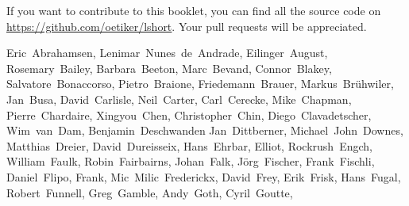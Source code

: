 If you want to contribute to this booklet, you can find all the source code
on \url{https://github.com/oetiker/lshort}. Your pull requests will be
appreciated.

\begin{FlushLeft}
  \small
  Eric~Abrahamsen,        %
  Lenimar~Nunes~de~Andrade, %
  Eilinger~August,        %
  Rosemary~Bailey,        %
  Barbara~Beeton,         %
  Marc~Bevand,            %
  Connor~Blakey,          %
  Salvatore~Bonaccorso,   %
  Pietro~Braione,         %
  Friedemann~Brauer,      %
  Markus~Br\"uhwiler,     %
  Jan~Busa,               %
  David~Carlisle,         %
  Neil~Carter,            %
  Carl~Cerecke,           %
  Mike~Chapman,           %
  Pierre~Chardaire,       %
  Xingyou~Chen,           %
  Christopher~Chin,       %
  Diego~Clavadetscher,    %
  Wim~van~Dam,            %
  Benjamin~Deschwanden    %
  Jan~Dittberner,         %
  Michael~John~Downes,    %
  Matthias~Dreier,        %
  David~Dureisseix,       %
  Hans~Ehrbar,            %
  Elliot,                 %
  Rockrush~Engch,         %
  William~Faulk,          %
  Robin~Fairbairns,       %
  Johan~Falk,             %
  J\"org~Fischer,         %
  Frank~Fischli,          %
  Daniel~Flipo,           %
  Frank,                  %
  Mic~Milic~Frederickx,   %
  David~Frey,             %
  Erik~Frisk,             %
  Hans~Fugal,             %
  Robert~Funnell,         %
  Greg~Gamble,            %
  Andy~Goth,              %
  Cyril~Goutte,           %

\end{FlushLeft}
